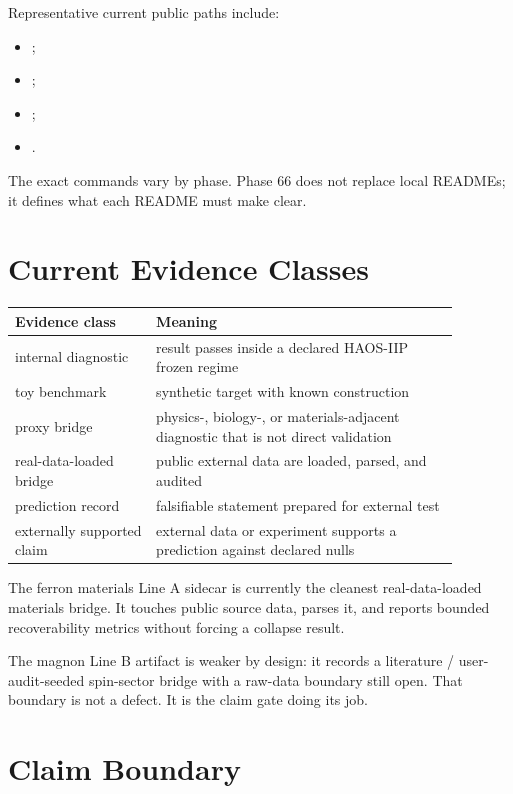 \documentclass[11pt]{article}
\begin{document}
Representative current public paths include:

\begin{itemize}
\item {};
\item {};
\item {};
\item {}.
\end{itemize}

The exact commands vary by phase. Phase 66 does not replace local READMEs; it defines what each README must make clear.

\section{Current Evidence Classes}

\begin{longtable}{p{0.28\linewidth}p{0.60\linewidth}}
\toprule
Evidence class & Meaning \\
\midrule
\endhead
internal diagnostic & result passes inside a declared HAOS-IIP frozen regime \\
toy benchmark & synthetic target with known construction \\
proxy bridge & physics-, biology-, or materials-adjacent diagnostic that is not direct validation \\
real-data-loaded bridge & public external data are loaded, parsed, and audited \\
prediction record & falsifiable statement prepared for external test \\
externally supported claim & external data or experiment supports a prediction against declared nulls \\
\bottomrule
\end{longtable}

The ferron materials Line A sidecar is currently the cleanest real-data-loaded materials bridge. It touches public source data, parses it, and reports bounded recoverability metrics without forcing a collapse result.

The magnon Line B artifact is weaker by design: it records a literature / user-audit-seeded spin-sector bridge with a raw-data boundary still open. That boundary is not a defect. It is the claim gate doing its job.

\section{Claim Boundary}
\end{document}
